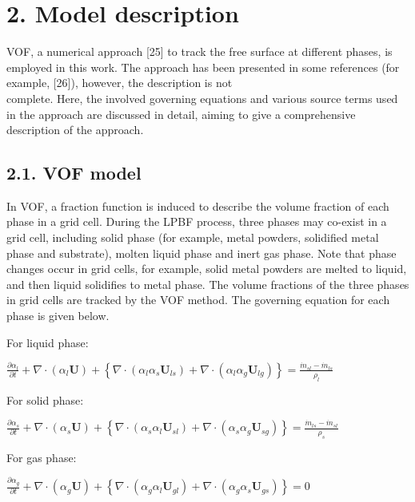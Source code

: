 \documentclass[10pt]{article}
\begin{document}
\section*{2. Model description}
VOF, a numerical approach [25] to track the free surface at different phases, is employed in this work. The approach has been presented in some references (for example, [26]), however, the description is not\\
complete. Here, the involved governing equations and various source terms used in the approach are discussed in detail, aiming to give a comprehensive description of the approach.

\subsection*{2.1. VOF model}
In VOF, a fraction function is induced to describe the volume fraction of each phase in a grid cell. During the LPBF process, three phases may co-exist in a grid cell, including solid phase (for example, metal powders, solidified metal phase and substrate), molten liquid phase and inert gas phase. Note that phase changes occur in grid cells, for example, solid metal powders are melted to liquid, and then liquid solidifies to metal phase. The volume fractions of the three phases in grid cells are tracked by the VOF method. The governing equation for each phase is given below.

For liquid phase:

$\frac{\partial \alpha_{l}}{\partial t}+\nabla \cdot\left(\alpha_{l} \mathbf{U}\right)+\left\{\nabla \cdot\left(\alpha_{l} \alpha_{s} \mathbf{U}_{l s}\right)+\nabla \cdot\left(\alpha_{l} \alpha_{g} \mathbf{U}_{l g}\right)\right\}=\frac{\dot{m}_{s l}-\dot{m}_{l s}}{\rho_{l}}$

For solid phase:

$\frac{\partial \alpha_{s}}{\partial t}+\nabla \cdot\left(\alpha_{s} \mathbf{U}\right)+\left\{\nabla \cdot\left(\alpha_{s} \alpha_{l} \mathbf{U}_{s l}\right)+\nabla \cdot\left(\alpha_{s} \alpha_{g} \mathbf{U}_{s g}\right)\right\}=\frac{\dot{m}_{l s}-\dot{m}_{s l}}{\rho_{s}}$

For gas phase:

$\frac{\partial \alpha_{g}}{\partial t}+\nabla \cdot\left(\alpha_{g} \mathbf{U}\right)+\left\{\nabla \cdot\left(\alpha_{g} \alpha_{l} \mathbf{U}_{g l}\right)+\nabla \cdot\left(\alpha_{g} \alpha_{s} \mathbf{U}_{g s}\right)\right\}=0$
\end{document}
